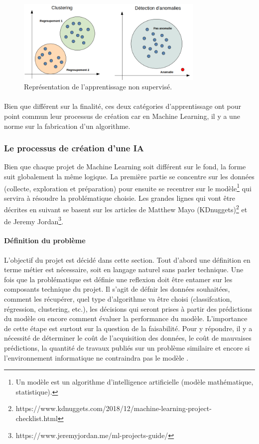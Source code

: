 \documentclass[10pt, french, a4paper]{report}
\begin{document}
\begin{figure}[hbt!]
    \centering
    \includegraphics[width=0.8\textwidth]{images/apprentissage_non_supervise.png}
    \caption{Représentation de l'apprentissage non supervisé.}
    \label{fig:apprentissage_non_supervise}
\end{figure}

\paragraph{}
Bien que différent sur la finalité, ces deux catégories d'apprentissage ont pour point commun leur processus de création car en Machine Learning, il y a une norme sur la fabrication d'un algorithme.

\subsubsection{Le processus de création d'une IA}

Bien que chaque projet de Machine Learning soit différent sur le fond, la forme suit globalement la même logique. La première partie se concentre sur les données (collecte, exploration et préparation) pour ensuite se recentrer sur le modèle\footnote{Un modèle est un algorithme d’intelligence artificielle (modèle mathématique, statistique).} qui servira à résoudre la problématique choisie. Les grandes lignes qui vont être décrites en suivant se basent sur les articles de Matthew Mayo (KDnuggets)\footnote{https://www.kdnuggets.com/2018/12/machine-learning-project-checklist.html} et de Jeremy Jordan\footnote{https://www.jeremyjordan.me/ml-projects-guide/}.

\paragraph{Définition du problème}
L'objectif du projet est décidé dans cette section. Tout d'abord une définition en terme métier est nécessaire, soit en langage naturel sans parler technique. Une fois que la problématique est définie une reflexion doit être entamer sur les composants technique du projet. Il s'agit de défnir les données souhaitées, comment les récupérer, quel type d'algorithme va être choisi (classifcation, régression, clustering, etc.), les décisions qui seront prises à partir des prédictions du modèle ou encore comment évaluer la performance du modèle. L'importance de cette étape est surtout sur la question de la faisabilité. Pour y répondre, il y a nécessité de déterminer le coût de l'acquisition des données, le coût de mauvaises prédictions, la quantité de travaux publiés sur un problème similaire et encore si l'environnement informatique ne contraindra pas le modèle \citep{jordan_organizing_2018}.
\end{document}
